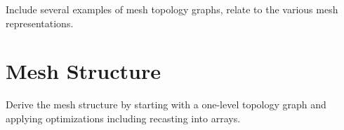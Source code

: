 \documentclass{article}
\begin{document}
Include several examples of mesh topology graphs,
relate to the various mesh representations.

\section{Mesh Structure}
Derive the mesh structure by starting with a
one-level topology graph and applying optimizations
including recasting into arrays.

% 
% 
\end{document}
